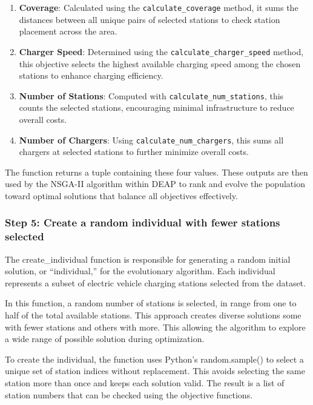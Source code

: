 \begin{enumerate}
    \item \textbf{Coverage}: Calculated using the \texttt{calculate\_coverage} method, it sums the distances between all unique pairs of selected stations to check station placement across the area.
    
    \item \textbf{Charger Speed}: Determined using the \texttt{calculate\_charger\_speed} method, this objective selects the highest available charging speed among the chosen stations to enhance charging efficiency.

    
    \item \textbf{Number of Stations}: Computed with \texttt{calculate\_num\_stations}, this counts the selected stations, encouraging minimal infrastructure to reduce overall costs.
    
    \item \textbf{Number of Chargers}: Using \texttt{calculate\_num\_chargers}, this sums all chargers at selected stations to further minimize overall costs.
\end{enumerate}

The function returns a tuple containing these four values. These outputs are then used by the NSGA-II algorithm within DEAP to rank and evolve the population toward optimal solutions that balance all objectives effectively\cite{Multi-Objective Optimization using Evolutionary Algorithms}.


\subsubsection*{Step 5: Create a random individual with fewer stations selected}
The create\_individual function is responsible for generating a random initial solution, or “individual,” for the evolutionary algorithm. Each individual represents a subset of electric vehicle charging stations selected from the dataset.

In this function, a random number of stations is selected, in range from one to half of the total available stations. This approach creates diverse solutions some with fewer stations and others with more. This allowing the algorithm to explore a wide range of possible solution during optimization.


To create the individual, the function uses Python’s random.sample() to select a unique set of station indices without replacement. This avoids selecting the same station more than once and keeps each solution valid. The result is a list of station numbers that can be checked using the objective functions.


